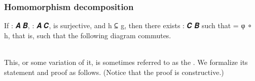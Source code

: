 \subsubsection{Homomorphism decomposition}\label{homomorphism-decomposition}

If  \as :  \ab 𝑨 \ab 𝑩,  \as :  \ab 𝑨 \ab 𝑪,  is surjective, and  \ab h \af ⊆  \ab g, then there exists  \as :  \ab 𝑪 \ab 𝑩 such that  \as = \ab φ \af ∘ \ab h, that is, such that the following diagram commutes.\\

\\
This, or some variation of it, is sometimes referred to as the . We formalize its statement and proof as follows. (Notice that the proof is constructive.)
\ccpad
